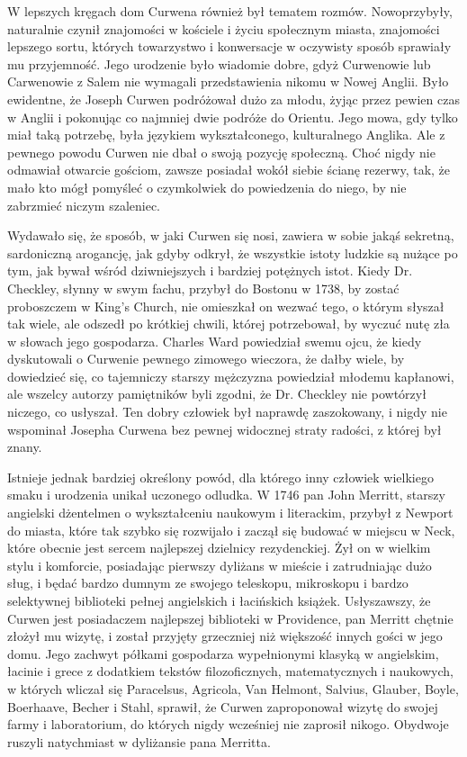 W lepszych kręgach dom Curwena również był tematem rozmów. Nowoprzybyły,  naturalnie czynił znajomości w kościele i życiu społecznym miasta, znajomości lepszego sortu, których towarzystwo i konwersacje w oczywisty sposób sprawiały mu przyjemność. Jego urodzenie było wiadomie dobre, gdyż Curwenowie lub Carwenowie z Salem nie wymagali przedstawienia nikomu w Nowej Anglii. Było ewidentne, że Joseph Curwen podróżował dużo za młodu, żyjąc przez pewien czas w Anglii i pokonując co najmniej dwie podróże do Orientu. Jego mowa, gdy tylko miał taką potrzebę, była językiem wykształconego, kulturalnego Anglika. Ale z pewnego powodu Curwen nie dbał o swoją pozycję społeczną. Choć nigdy nie odmawiał otwarcie gościom, zawsze posiadał wokół siebie ścianę rezerwy, tak, że mało kto mógł pomyśleć o czymkolwiek do powiedzenia do niego, by nie zabrzmieć niczym szaleniec. 

Wydawało się, że sposób, w jaki Curwen się nosi, zawiera w sobie jakąś sekretną, sardoniczną arogancję, jak gdyby odkrył, że wszystkie istoty ludzkie są nużące po tym, jak bywał wśród dziwniejszych i bardziej potężnych istot. Kiedy Dr. Checkley, słynny w swym fachu, przybył do Bostonu w 1738, by zostać proboszczem w King's Church, nie omieszkał on wezwać tego, o którym słyszał tak wiele, ale odszedł po krótkiej chwili, której potrzebował, by wyczuć nutę zła w słowach jego gospodarza. Charles Ward powiedział swemu ojcu, że kiedy dyskutowali o Curwenie pewnego zimowego wieczora, że dałby wiele, by dowiedzieć się, co tajemniczy starszy mężczyzna powiedział młodemu kapłanowi, ale wszelcy autorzy pamiętników byli zgodni, że Dr. Checkley nie powtórzył niczego, co usłyszał. Ten dobry człowiek był naprawdę zaszokowany, i nigdy nie wspominał Josepha Curwena bez pewnej widocznej straty radości, z której był znany.

Istnieje jednak bardziej określony powód, dla którego inny człowiek wielkiego smaku i urodzenia unikał uczonego odludka. W 1746 pan John Merritt, starszy angielski dżentelmen o wykształceniu naukowym i literackim, przybył z Newport do miasta, które tak szybko się rozwijało i zaczął się budować w miejscu w Neck, które obecnie jest sercem najlepszej dzielnicy rezydenckiej. Żył on w wielkim stylu i komforcie, posiadając pierwszy dyliżans w mieście i zatrudniając dużo sług, i będać bardzo dumnym ze swojego teleskopu, mikroskopu i bardzo selektywnej biblioteki pełnej angielskich i łacińskich książek. Usłyszawszy, że Curwen jest posiadaczem najlepszej biblioteki w Providence, pan Merritt chętnie złożył mu wizytę, i został przyjęty grzeczniej niż większość innych gości w jego domu. Jego zachwyt półkami gospodarza wypełnionymi klasyką w angielskim, łacinie i grece z dodatkiem tekstów filozoficznych, matematycznych i naukowych, w których wliczał się Paracelsus, Agricola, Van Helmont, Salvius, Glauber, Boyle, Boerhaave, Becher i Stahl, sprawił, że Curwen zaproponował wizytę do swojej farmy i laboratorium, do których nigdy wcześniej nie zaprosił nikogo. Obydwoje ruszyli natychmiast w dyliżansie pana Merritta.

